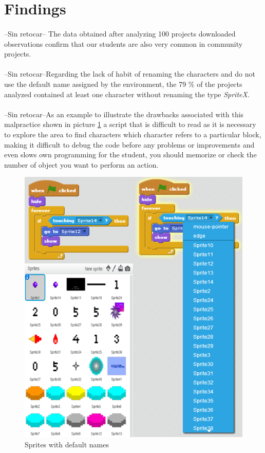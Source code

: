 \documentclass[a4paper,10pt]{article}
\begin{document}
\section{Findings}
\paragraph{}--Sin retocar--
The data obtained after analyzing 100 projects downloaded observations confirm that our students are also very common in community projects.
\paragraph{}--Sin retocar--Regarding the lack of habit of renaming the characters and do not use the default name assigned by the environment, the 79 \% of the projects analyzed contained at least one character without renaming the type \textit{SpriteX}.
\paragraph{}--Sin retocar--As an example to illustrate the drawbacks associated with this malpractice shown in picture \ref{fig:SpriteNaming}  a script that is difficult to read as it is necessary to explore the area to find characters which character refers to a particular block, making it difficult to debug the code before any problems or improvements and even slows own programming for the student, you should memorize or check the number of object you want to perform an action.
\begin{figure}
  \centering
    \includegraphics{img/SpriteNaming.png}
  \caption{Sprites with default names}
  \label{fig:SpriteNaming}
\end{figure}
\end{document}
